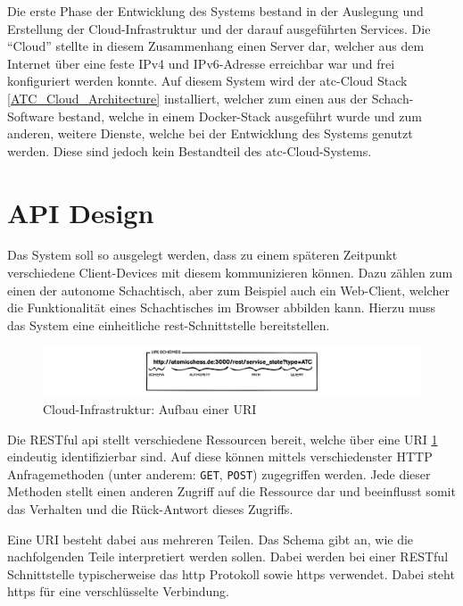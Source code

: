 Die erste Phase der Entwicklung des Systems bestand in der Auslegung und
Erstellung der Cloud-Infrastruktur und der darauf ausgeführten Services.
Die ``Cloud'' stellte in diesem Zusammenhang einen Server dar, welcher
aus dem Internet über eine feste IPv4 und IPv6-Adresse erreichbar war
und frei konfiguriert werden konnte. Auf diesem System wird der
\gls{atc}-Cloud Stack \ref{ATC_Cloud_Architecture} installiert, welcher
zum einen aus der Schach-Software bestand, welche in einem Docker-Stack
ausgeführt wurde und zum anderen, weitere Dienste, welche bei der
Entwicklung des Systems genutzt werden. Diese sind jedoch kein
Bestandteil des \gls{atc}-Cloud-Systems.

\hypertarget{api-design}{%
\section{API Design}\label{api-design}}

Das System soll so ausgelegt werden, dass zu einem späteren Zeitpunkt
verschiedene Client-Devices mit diesem kommunizieren können. Dazu zählen
zum einen der autonome Schachtisch, aber zum Beispiel auch ein
Web-Client, welcher die Funktionalität eines Schachtisches im Browser
abbilden kann. Hierzu muss das System eine einheitliche
\gls{rest}-Schnittstelle bereitstellen.

\begin{figure}
\centering
\includegraphics{images/ATC_URI_SCHEMES.png}
\caption{Cloud-Infrastruktur: Aufbau einer URI \label{ATC_URI_SCHEMES}}
\end{figure}

Die RESTful \gls{api} stellt verschiedene Ressourcen bereit, welche über
eine URI \ref{ATC_URI_SCHEMES} eindeutig identifizierbar sind. Auf diese
können mittels verschiedenster HTTP Anfragemethoden (unter anderem:
\passthrough{\lstinline!GET!}, \passthrough{\lstinline!POST!})
zugegriffen werden. Jede dieser Methoden stellt einen anderen Zugriff
auf die Ressource dar und beeinflusst somit das Verhalten und die
Rück-Antwort dieses Zugriffs.

Eine URI besteht dabei aus mehreren Teilen. Das Schema gibt an, wie die
nachfolgenden Teile interpretiert werden sollen. Dabei werden bei einer
RESTful Schnittstelle typischerweise das \gls{http} Protokoll sowie
\gls{https} verwendet. Dabei steht \gls{https} für eine verschlüsselte
Verbindung.

